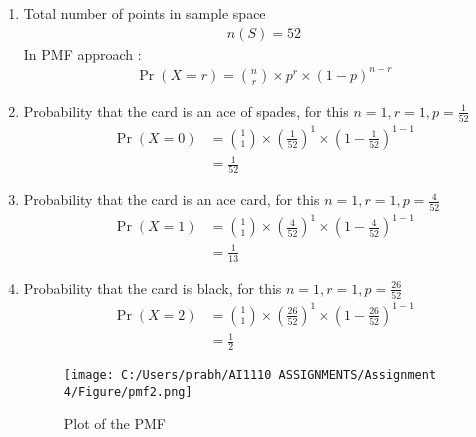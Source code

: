 \documentclass[journal,12pt,twocolumn]{IEEEtran}
\providecommand{\pr}[1]{\ensuremath{\Pr\left(#1\right)}}
\begin{document}
	\begin{enumerate}
		\item Total number of points in sample space\\
		\begin{align}
		  n(S) = 52 
		  \end{align}
			In PMF approach :
		\begin{align}
			\pr{X = r} = {n\choose r}\times p^{r} \times (1-p)^{n-r} 
		\end{align}
		\item Probability that the card is an ace of spades, for this $  n=1 ,r=1 , p=\frac{1}{52} $
		\begin{align}
			\pr{X = 0} &= {1\choose 1}\times (\frac{1}{52})^{1} \times (1-\frac{1}{52})^{1-1} \\
			&= \frac{1}{52}
		\end{align}

		\item Probability that the card is an ace card, for this $  n=1, r=1 ,p=\frac{4}{52}  $
		\begin{align}
			\pr{X = 1} &= {1\choose 1}\times (\frac{4}{52})^{1} \times (1-\frac{4}{52})^{1-1}  \\
			&=\frac{1}{13}
		\end{align}
		\item Probability that the card is black, for this $  n=1, r=1 ,p=\frac{26}{52}  $
		\begin{align}
			\pr{X = 2} &= {1\choose 1}\times (\frac{26}{52})^{1} \times (1-\frac{26}{52})^{1-1}\\
			&=\frac{1}{2}
		\end{align}
	\begin{figure}[!ht]
		\centering
		\texttt{[image: C:/Users/prabh/AI1110 ASSIGNMENTS/Assignment 4/Figure/pmf2.png]}
		\caption{Plot of the PMF}
		\label{fig:pmf}
	\end{figure}
		
	\end{enumerate}
\end{document}
